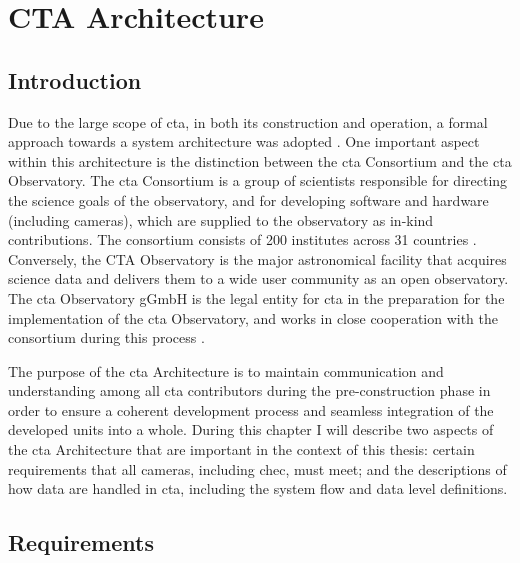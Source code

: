 \chapter{\label{ch3-architecture}CTA Architecture} 

\minitoc

\section{Introduction}

Due to the large scope of \gls{cta}, in both its construction and operation, a formal approach towards a system architecture was adopted \cite{Dazzi2018}. One important aspect within this architecture is the distinction between the \gls{cta} Consortium and the \gls{cta} Observatory. The \gls{cta} Consortium is a group of scientists responsible for directing the science goals of the observatory, and for developing software and hardware (including cameras), which are supplied to the observatory as in-kind contributions. The consortium consists of 200 institutes across 31 countries \cite{cta-consortium}. Conversely, the CTA Observatory is the major astronomical facility that acquires science data and delivers them to a wide user community as an open observatory. The \gls{cta} Observatory gGmbH is the legal entity for \gls{cta} in the preparation for the implementation of the \gls{cta} Observatory, and works in close cooperation with the consortium during this process \cite{cta-observatory}.

The purpose of the \gls{cta} Architecture is to maintain communication and understanding among all \gls{cta} contributors during the pre-construction phase in order to ensure a coherent development process and seamless integration of the developed units into a whole. During this chapter I will describe two aspects of the \gls{cta} Architecture that are important in the context of this thesis: certain requirements that all cameras, including \gls{chec}, must meet; and the descriptions of how data are handled in \gls{cta}, including the system flow and data level definitions.

\section{Requirements}

